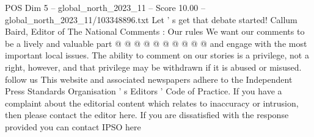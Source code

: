 \begin{textsample}{POS Dim 5 – global\_north\_2023\_11 – Score 10.00 – global\_north\_2023\_11/103348896.txt}
Let ' s get that debate started!
Callum Baird, Editor of The National Comments : Our rules We want our comments to be a lively and valuable part @ @ @ @ @ @ @ @ @ @ and engage with the most important local issues.
The ability to comment on our stories is a privilege, not a right, however, and that privilege may be withdrawn if it is abused or misused. follow us This website and associated newspapers adhere to the Independent Press Standards Organisation ' s Editors ' Code of Practice.
If you have a complaint about the editorial content which relates to inaccuracy or intrusion, then please contact the editor here.
If you are dissatisfied with the response provided you can contact IPSO here

\end{textsample}
